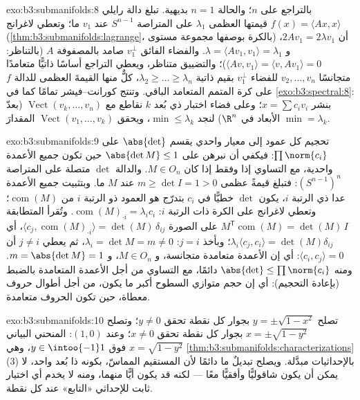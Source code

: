 \begin{solution}{exo:b3:submanifolds:8}
بالتراجع على $n$؛ والحالة $n = 1$ بديهية. تبلغ دالة رايلي
$f(x) = \langle Ax, x\rangle$ قيمتها العظمى $\lambda_1$ على المتراصة $S^{n-1}$ عند
$v_1$ ما؛ وتعطي لاغرانج (\cref{thm:b3:submanifolds:lagrange}، بالكرة بوصفها مجموعة
مستوى) أن $2Av_1 = 2\lambda v_1$، و $\lambda = \langle Av_1,
v_1\rangle = \lambda_1$. والفضاء الفائق $v_1^\perp$ صامد
بالمصفوفة $A$ (بالتناظر: $\langle Av, v_1\rangle = \langle
v, Av_1\rangle = 0$)؛ والتضييق متناظر، ويعطي
التراجع أساسًا ذاتيًّا متعامدًا متجانسًا $v_2, \dots, v_n$ للفضاء
$v_1^\perp$ بقيم ذاتية $\lambda_2 \geq \dots \geq
\lambda_n$، كلٌّ منها القيمةَ العظمى للدالة
$f$ على كرة المتمم المتعامد الباقي. وتنتج كورانت--فيشر تمامًا
كما في \cref{exo:b3:spectral:8}: بنشر $x = \sum c_iv_i$؛ وعلى فضاء اختبار ذي بُعد $k$
نقاطع مع $\operatorname{Vect}(v_k, \dots, v_n)$ (بعدّ الأبعاد في $\R^n$) لنجد $\min \leq \lambda_k$، ويحقق
$\operatorname{Vect}(v_1, \dots, v_k)$ المقدارَ $\min =
\lambda_k$.
\end{solution}

\begin{solution}{exo:b3:submanifolds:9}
تحجيم كل عمود إلى معيار واحدي يقسم $\abs{\det}$ على $\prod\norm{c_i}$:
فيكفي أن نبرهن على $\abs{\det M} \leq 1$ حين تكون جميع الأعمدة واحدية، مع
التساوي إذا وفقط إذا كان $M \in O_n$. والدالة $\det$ متصلة على
المتراصة $(S^{n-1})^n$: فتبلغ قيمةً عظمى $m \geq \det I = 1 > 0$ عند $M$ ما.
وبتثبيت جميع الأعمدة عدا ذي الرتبة $i$، يكون $\det$ خطيًّا في
$c_i$ بتدرّج هو العمود ذو الرتبة $i$ من $\operatorname{com}(M)$؛ وتعطي لاغرانج
على الكرة ذات الرتبة $i$: $\operatorname{com}(M)_{\cdot i} = \lambda_i c_i$. وتُقرأ المتطابقة $M^{\mathsf T}\operatorname{com}(M) = \det(M)\,I$ على
الصورة $\langle c_j, \operatorname{com}(M)_{\cdot i}\rangle =
\det(M)\,\delta_{ij}$، أي $\lambda_i\langle c_j,
c_i\rangle = \det(M)\delta_{ij}$؛ وبأخذ $j = i$: $\lambda_i
= \det M = m \neq 0$، ثم يعطي
$j \neq i$ أن $\langle c_i,
c_j\rangle = 0$: أي إن الأعمدة متعامدة متجانسة، و
$M \in O_n$، و $m = \abs{\det M} = 1$. ومنه $\abs{\det} \leq
\prod\norm{c_i}$ دائمًا، مع التساوي من أجل
الأعمدة المتعامدة بالضبط (بإعادة التحجيم): أي إن حجم متوازي
السطوح أكبر ما يكون، من أجل أطوال حروف معطاة، حين تكون الحروف
متعامدة.
\end{solution}

\begin{solution}{exo:b3:submanifolds:10}
تصلح $y = \pm\sqrt{1 - x^2}$ بجوار كل نقطة تحقق $y \neq
0$؛ وتصلح $x = \pm\sqrt{1 - y^2}$ بجوار كل
نقطة تحقق $x \neq 0$؛ وعند $(1, 0)$: المنحني البياني $x = \sqrt{1 - y^2}$
فوق $y \in
\intoo{-1}1$، وهي \cref{thm:b3:submanifolds:characterizations}(3) بالإحداثيات مبدَّلة. ويصلح
تبديلٌ ما دائمًا لأن المستقيم المماسّ، بكونه ذا بُعد واحد، لا
يمكن أن يكون شاقوليًّا وأفقيًّا معًا --- لكنه قد يكون أيًّا
منهما، ومنه لا يخدم أي اختيار ثابت للإحداثي «التابع» عند كل
نقطة.
\end{solution}


